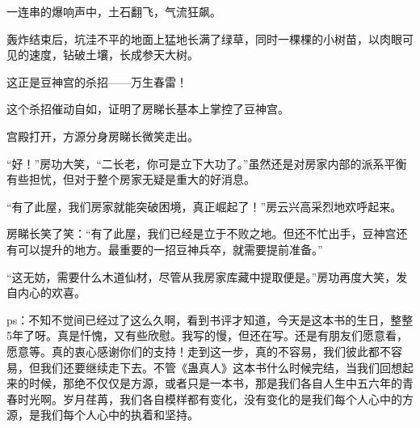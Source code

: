 \begin{this_body}
一连串的爆响声中，土石翻飞，气流狂飙。

轰炸结束后，坑洼不平的地面上猛地长满了绿草，同时一棵棵的小树苗，以肉眼可见的速度，钻破土壤，长成参天大树。

这正是豆神宫的杀招——万生春雷！

这个杀招催动自如，证明了房睇长基本上掌控了豆神宫。

宫殿打开，方源分身房睇长微笑走出。

“好！”房功大笑，“二长老，你可是立下大功了。”虽然还是对房家内部的派系平衡有些担忧，但对于整个房家无疑是重大的好消息。

“有了此屋，我们房家就能突破困境，真正崛起了！”房云兴高采烈地欢呼起来。

房睇长笑了笑：“有了此屋，我们已经是立于不败之地。但还不忙出手，豆神宫还有可以提升的地方。最重要的一招豆神兵卒，就需要提前准备。”

“这无妨，需要什么木道仙材，尽管从我房家库藏中提取便是。”房功再度大笑，发自内心的欢喜。

ps：不知不觉间已经过了这么久啊，看到书评才知道，今天是这本书的生日，整整5年了呀。真是忏愧，又有些欣慰。我写的慢，但还在写。还是有朋友们愿意看，愿意等。真的衷心感谢你们的支持！走到这一步，真的不容易，我们彼此都不容易，但我们还要继续走下去。不管《蛊真人》这本书什么时候完结，当我们回想起来的时候，那绝不仅仅是方源，或者只是一本书，那是我们各自人生中五六年的青春时光啊。岁月荏苒，我们各自模样都有变化，没有变化的是我们每个人心中的方源，是我们每个人心中的执着和坚持。

\end{this_body}

